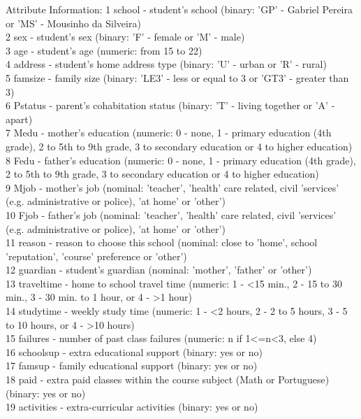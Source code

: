 \documentclass{article}
\begin{document}
Attribute Information:
1 school - student's school (binary: 'GP' - Gabriel Pereira or 'MS' - Mousinho da Silveira) \\
2 sex - student's sex (binary: 'F' - female or 'M' - male) \\
3 age - student's age (numeric: from 15 to 22) \\
4 address - student's home address type (binary: 'U' - urban or 'R' - rural) \\
5 famsize - family size (binary: 'LE3' - less or equal to 3 or 'GT3' - greater than 3) \\
6 Pstatus - parent's cohabitation status (binary: 'T' - living together or 'A' - apart) \\
7 Medu - mother's education (numeric: 0 - none, 1 - primary education (4th grade), 2 to 5th to 9th grade, 3 to secondary education or 4 to higher education) \\
8 Fedu - father's education (numeric: 0 - none, 1 - primary education (4th grade), 2 to 5th to 9th grade, 3 to secondary education or 4 to higher education) \\
9 Mjob - mother's job (nominal: 'teacher', 'health' care related, civil 'services' (e.g. administrative or police), 'at home' or 'other') \\
10 Fjob - father's job (nominal: 'teacher', 'health' care related, civil 'services' (e.g. administrative or police), 'at home' or 'other') \\
11 reason - reason to choose this school (nominal: close to 'home', school 'reputation', 'course' preference or 'other') \\
12 guardian - student's guardian (nominal: 'mother', 'father' or 'other') \\
13 traveltime - home to school travel time (numeric: 1 - <15 min., 2 - 15 to 30 min., 3 - 30 min. to 1 hour, or 4 - >1 hour) \\
14 studytime - weekly study time (numeric: 1 - <2 hours, 2 - 2 to 5 hours, 3 - 5 to 10 hours, or 4 - >10 hours) \\
15 failures - number of past class failures (numeric: n if 1<=n<3, else 4) \\
16 schoolsup - extra educational support (binary: yes or no) \\
17 famsup - family educational support (binary: yes or no) \\
18 paid - extra paid classes within the course subject (Math or Portuguese) (binary: yes or no) \\
19 activities - extra-curricular activities (binary: yes or no) \\
\end{document}
